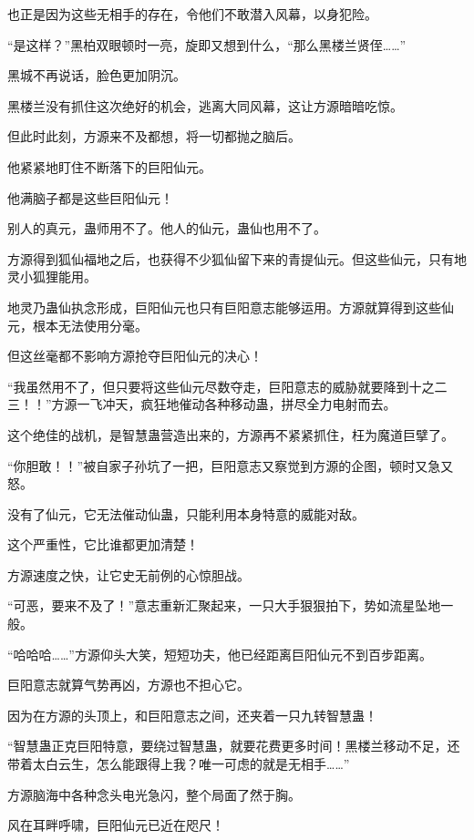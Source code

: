 \begin{this_body}
也正是因为这些无相手的存在，令他们不敢潜入风幕，以身犯险。

“是这样？”黑柏双眼顿时一亮，旋即又想到什么，“那么黑楼兰贤侄……”

黑城不再说话，脸色更加阴沉。

黑楼兰没有抓住这次绝好的机会，逃离大同风幕，这让方源暗暗吃惊。

但此时此刻，方源来不及都想，将一切都抛之脑后。

他紧紧地盯住不断落下的巨阳仙元。

他满脑子都是这些巨阳仙元！

别人的真元，蛊师用不了。他人的仙元，蛊仙也用不了。

方源得到狐仙福地之后，也获得不少狐仙留下来的青提仙元。但这些仙元，只有地灵小狐狸能用。

地灵乃蛊仙执念形成，巨阳仙元也只有巨阳意志能够运用。方源就算得到这些仙元，根本无法使用分毫。

但这丝毫都不影响方源抢夺巨阳仙元的决心！

“我虽然用不了，但只要将这些仙元尽数夺走，巨阳意志的威胁就要降到十之二三！！”方源一飞冲天，疯狂地催动各种移动蛊，拼尽全力电射而去。

这个绝佳的战机，是智慧蛊营造出来的，方源再不紧紧抓住，枉为魔道巨擘了。

“你胆敢！！”被自家子孙坑了一把，巨阳意志又察觉到方源的企图，顿时又急又怒。

没有了仙元，它无法催动仙蛊，只能利用本身特意的威能对敌。

这个严重性，它比谁都更加清楚！

方源速度之快，让它史无前例的心惊胆战。

“可恶，要来不及了！”意志重新汇聚起来，一只大手狠狠拍下，势如流星坠地一般。

“哈哈哈……”方源仰头大笑，短短功夫，他已经距离巨阳仙元不到百步距离。

巨阳意志就算气势再凶，方源也不担心它。

因为在方源的头顶上，和巨阳意志之间，还夹着一只九转智慧蛊！

“智慧蛊正克巨阳特意，要绕过智慧蛊，就要花费更多时间！黑楼兰移动不足，还带着太白云生，怎么能跟得上我？唯一可虑的就是无相手……”

方源脑海中各种念头电光急闪，整个局面了然于胸。

风在耳畔呼啸，巨阳仙元已近在咫尺！

\end{this_body}

